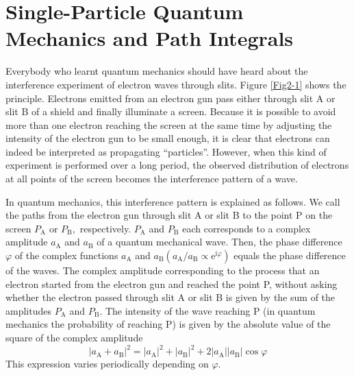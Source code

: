 
\section{Single-Particle Quantum Mechanics and Path Integrals}

Everybody who learnt quantum mechanics should have heard about the interference experiment of electron waves through slits. Figure \ref{Fig2-1} shows the principle. Electrons emitted from an electron gun pass either through slit A or slit B of a shield and finally illuminate a screen. Because it is possible to avoid more than one electron reaching the screen at the same time by adjusting the intensity of the electron gun to be small enough, it is clear that electrons can indeed be interpreted as propagating “particles”. However, when this kind of experiment is performed over a long period, the observed distribution of electrons at all points of the screen becomes the interference pattern of a wave.

In quantum mechanics, this interference pattern is explained as follows. We call the paths from the electron gun through slit A or slit B to the point P on the screen $P _ { \mathrm { A } }$ or $P _ { \mathrm { B } } ,$ respectively. $P _ { \mathrm { A } }$ and $P _ { \mathrm { B } }$ each corresponds to a complex amplitude $a _ { \mathrm { A } }$ and $a _ { \mathrm { B } }$ of a quantum mechanical wave. Then, the phase difference $\varphi$ of the complex functions $a _ { \mathrm { A } }$ and $a _ { \mathrm { B } } \left( a _ { \mathrm { A } } / a _ { \mathrm { B } } \propto \mathrm { e } ^ { \mathrm { i } \varphi } \right)$ equals the phase difference of the waves. The complex amplitude corresponding to the process that an electron started from the electron gun and reached the point P, without asking whether the electron passed through slit A or slit B is given by the sum of the amplitudes $P _ { \mathrm { A } }$ and $P _ { \mathrm { B } }$. The intensity of the wave reaching P (in quantum mechanics the probability of reaching P) is given by the absolute value of the square of the complex amplitude
\[\left| a _ { \mathrm { A } } + a _ { \mathrm { B } } \right| ^ { 2 } = \left| a _ { \mathrm { A } } \right| ^ { 2 } + \left| a _ { \mathrm { B } } \right| ^ { 2 } + 2 \left| a _ { \mathrm { A } } \right| \left| a _ { \mathrm { B } } \right| \cos \varphi\]
This expression varies periodically depending on $\varphi$. 



